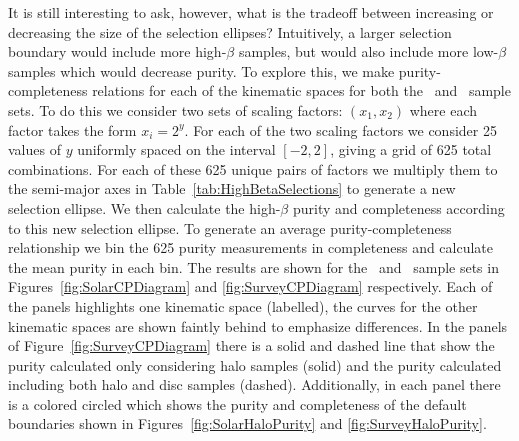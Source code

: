 It is still interesting to ask, however, what is the tradeoff between increasing or decreasing the size of the selection ellipses? Intuitively, a larger selection boundary would include more high-$\beta$ samples, but would also include more low-$\beta$ samples which would decrease purity. To explore this, we make purity-completeness relations for each of the kinematic spaces for both the \solar\ and \survey\ sample sets. To do this we consider two sets of scaling factors: $(x_{1},x_{2})$ where each factor takes the form $x_{i} = 2^{y}$. For each of the two scaling factors we consider 25 values of $y$ uniformly spaced on the interval $[-2,2]$, giving a grid of 625 total combinations. For each of these 625 unique pairs of factors we multiply them to the semi-major axes in Table~\ref{tab:HighBetaSelections} to generate a new selection ellipse. We then calculate the high-$\beta$ purity and completeness according to this new selection ellipse. To generate an average purity-completeness relationship we bin the 625 purity measurements in completeness and calculate the mean purity in each bin. The results are shown for the \solar\ and \survey\ sample sets in Figures~\ref{fig:SolarCPDiagram} and \ref{fig:SurveyCPDiagram} respectively. Each of the panels highlights one kinematic space (labelled), the curves for the other kinematic spaces are shown faintly behind to emphasize differences. In the panels of Figure~\ref{fig:SurveyCPDiagram} there is a solid and dashed line that show the purity calculated only considering halo samples (solid) and the purity calculated including both halo and disc samples (dashed). Additionally, in each panel there is a colored circled which shows the purity and completeness of the default boundaries shown in Figures~\ref{fig:SolarHaloPurity} and \ref{fig:SurveyHaloPurity}.

